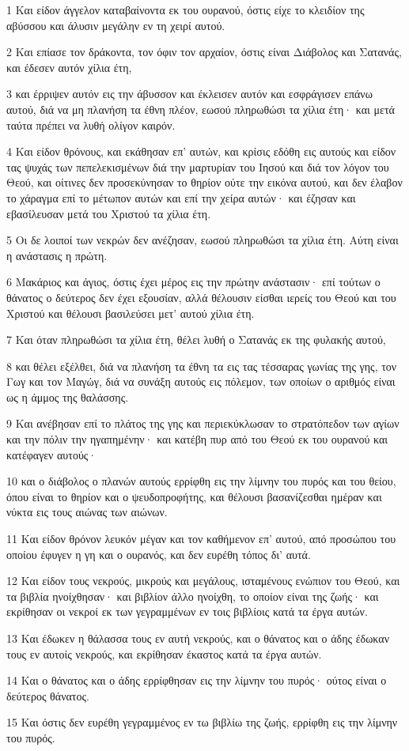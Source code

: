 \par 1 Και είδον άγγελον καταβαίνοντα εκ του ουρανού, όστις είχε το κλειδίον της αβύσσου και άλυσιν μεγάλην εν τη χειρί αυτού.
\par 2 Και επίασε τον δράκοντα, τον όφιν τον αρχαίον, όστις είναι Διάβολος και Σατανάς, και έδεσεν αυτόν χίλια έτη,
\par 3 και έρριψεν αυτόν εις την άβυσσον και έκλεισεν αυτόν και εσφράγισεν επάνω αυτού, διά να μη πλανήση τα έθνη πλέον, εωσού πληρωθώσι τα χίλια έτη· και μετά ταύτα πρέπει να λυθή ολίγον καιρόν.
\par 4 Και είδον θρόνους, και εκάθησαν επ' αυτών, και κρίσις εδόθη εις αυτούς και είδον τας ψυχάς των πεπελεκισμένων διά την μαρτυρίαν του Ιησού και διά τον λόγον του Θεού, και οίτινες δεν προσεκύνησαν το θηρίον ούτε την εικόνα αυτού, και δεν έλαβον το χάραγμα επί το μέτωπον αυτών και επί την χείρα αυτών· και έζησαν και εβασίλευσαν μετά του Χριστού τα χίλια έτη.
\par 5 Οι δε λοιποί των νεκρών δεν ανέζησαν, εωσού πληρωθώσι τα χίλια έτη. Αύτη είναι η ανάστασις η πρώτη.
\par 6 Μακάριος και άγιος, όστις έχει μέρος εις την πρώτην ανάστασιν· επί τούτων ο θάνατος ο δεύτερος δεν έχει εξουσίαν, αλλά θέλουσιν είσθαι ιερείς του Θεού και του Χριστού και θέλουσι βασιλεύσει μετ' αυτού χίλια έτη.
\par 7 Και όταν πληρωθώσι τα χίλια έτη, θέλει λυθή ο Σατανάς εκ της φυλακής αυτού,
\par 8 και θέλει εξέλθει, διά να πλανήση τα έθνη τα εις τας τέσσαρας γωνίας της γης, τον Γωγ και τον Μαγώγ, διά να συνάξη αυτούς εις πόλεμον, των οποίων ο αριθμός είναι ως η άμμος της θαλάσσης.
\par 9 Και ανέβησαν επί το πλάτος της γης και περιεκύκλωσαν το στρατόπεδον των αγίων και την πόλιν την ηγαπημένην· και κατέβη πυρ από του Θεού εκ του ουρανού και κατέφαγεν αυτούς·
\par 10 και ο διάβολος ο πλανών αυτούς ερρίφθη εις την λίμνην του πυρός και του θείου, όπου είναι το θηρίον και ο ψευδοπροφήτης, και θέλουσι βασανίζεσθαι ημέραν και νύκτα εις τους αιώνας των αιώνων.
\par 11 Και είδον θρόνον λευκόν μέγαν και τον καθήμενον επ' αυτού, από προσώπου του οποίου έφυγεν η γη και ο ουρανός, και δεν ευρέθη τόπος δι' αυτά.
\par 12 Και είδον τους νεκρούς, μικρούς και μεγάλους, ισταμένους ενώπιον του Θεού, και τα βιβλία ηνοίχθησαν· και βιβλίον άλλο ηνοίχθη, το οποίον είναι της ζωής· και εκρίθησαν οι νεκροί εκ των γεγραμμένων εν τοις βιβλίοις κατά τα έργα αυτών.
\par 13 Και έδωκεν η θάλασσα τους εν αυτή νεκρούς, και ο θάνατος και ο άδης έδωκαν τους εν αυτοίς νεκρούς, και εκρίθησαν έκαστος κατά τα έργα αυτών.
\par 14 Και ο θάνατος και ο άδης ερρίφθησαν εις την λίμνην του πυρός· ούτος είναι ο δεύτερος θάνατος.
\par 15 Και όστις δεν ευρέθη γεγραμμένος εν τω βιβλίω της ζωής, ερρίφθη εις την λίμνην του πυρός.

